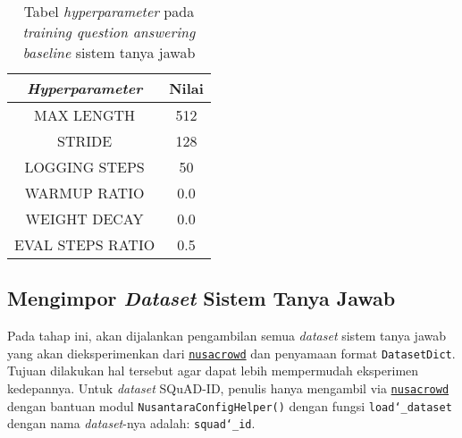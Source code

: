 \begin{table}[h]
\centering
\begin{tabular}{||c | c||} 
 \hline\hline
 \emph{Hyperparameter} & Nilai \\ [0.5ex] 
 \hline\hline
 MAX LENGTH & 512 \\ 
 STRIDE & 128 \\
 LOGGING STEPS & 50 \\
 WARMUP RATIO & 0.0 \\
 WEIGHT DECAY & 0.0 \\ 
 EVAL STEPS RATIO & 0.5 \\ [1ex] 
 \hline\hline
\end{tabular}
\caption{Tabel \emph{hyperparameter} pada \emph{training question answering} \emph{baseline} sistem tanya jawab}
\end{table}

\subsection{Mengimpor \emph{Dataset} Sistem Tanya Jawab}
Pada tahap ini, akan dijalankan pengambilan semua \emph{dataset} sistem tanya jawab yang akan dieksperimenkan dari \href{https://github.com/IndoNLP/nusa-crowd/tree/master/nusacrowd/nusa_datasets/}{\texttt{nusacrowd}} dan penyamaan format \texttt{DatasetDict}. Tujuan dilakukan hal tersebut agar dapat lebih mempermudah eksperimen kedepannya. Untuk \emph{dataset} SQuAD-ID, penulis hanya mengambil via \href{https://github.com/IndoNLP/nusa-crowd/tree/master/nusacrowd/nusa_datasets/}{\texttt{nusacrowd}} dengan bantuan modul \texttt{NusantaraConfigHelper()} dengan fungsi \texttt{load\char`_dataset} dengan nama \emph{dataset}-nya adalah: \texttt{squad\char`_id}. 

